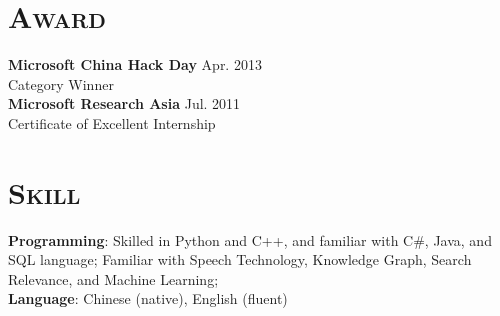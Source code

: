 \begin{resume}




\vspace*{-12pt}
\section{\textsc{Award}}
\textbf{Microsoft China Hack Day} \hfill Apr. 2013 \\
Category Winner\\
\vspace*{-6pt}
\newline
\textbf{Microsoft Research Asia} \hfill Jul. 2011 \\
Certificate of Excellent Internship\\

\vspace*{-12pt}
\section{\textsc{Skill}}
\textbf{Programming}: Skilled in Python and C++, and familiar with C\#, Java, and SQL language; Familiar with Speech Technology, Knowledge Graph, Search Relevance, and Machine Learning;  \\
\vspace*{-8pt}
\newline
\textbf{Language}: Chinese (native), English (fluent)



\end{resume}
